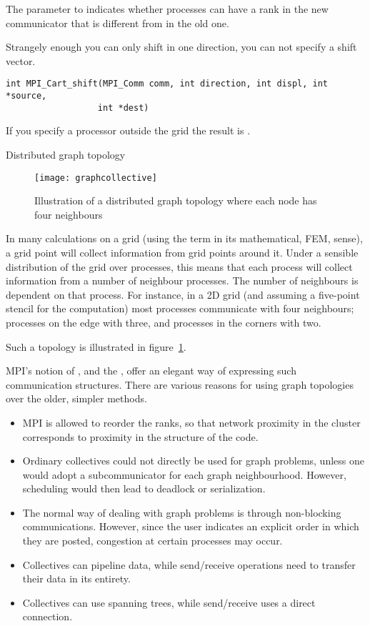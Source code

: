The  parameter to 
indicates whether processes can have a rank
in the new communicator that is different from in the old one.

Strangely enough you can only shift in one direction, you can not
specify a shift vector.
\begin{lstlisting}
int MPI_Cart_shift(MPI_Comm comm, int direction, int displ, int *source, 
                  int *dest)
\end{lstlisting}
If you specify a processor outside the grid
the result is .


 {Distributed graph topology}
\label{sec:mpi-dist-graph}

\begin{figure}[ht]
  \texttt{[image: graphcollective]}
  \caption{Illustration of a distributed graph topology where each
    node has four neighbours}
  \label{fig:graphcollective}
\end{figure}

In many calculations on a grid (using the term in its mathematical,
\ac{FEM}, sense), a grid point will collect information from grid
points around it. Under a sensible distribution of the grid over
processes, this means that each process will collect information from
a number of neighbour processes. The number of 
neighbours is dependent on that process. For instance, in a 2D
grid (and assuming a five-point stencil for the computation) most
processes communicate with four neighbours; processes on the edge with
three, and processes in the corners with two.

Such a topology is illustrated in figure~\ref{fig:graphcollective}.

MPI's notion of , and the
, offer an elegant way of
expressing such communication structures. There are various reasons
for using graph topologies over the older, simpler methods.
\begin{itemize}
\item MPI is allowed to reorder the ranks, so that network proximity
  in the cluster corresponds to proximity in the structure of the
  code.
\item Ordinary collectives could not directly be used for graph
  problems, unless one would adopt a subcommunicator for each graph
  neighbourhood. However, scheduling would then lead to deadlock or
  serialization.
\item The normal way of dealing with graph problems is through
  non-blocking communications. However, since the user indicates an
  explicit order in which they are posted, congestion at certain
  processes may occur.
\item Collectives can pipeline data, while send/receive operations
  need to transfer their data in its entirety.
\item Collectives can use spanning trees, while send/receive uses a
  direct connection.
\end{itemize}

